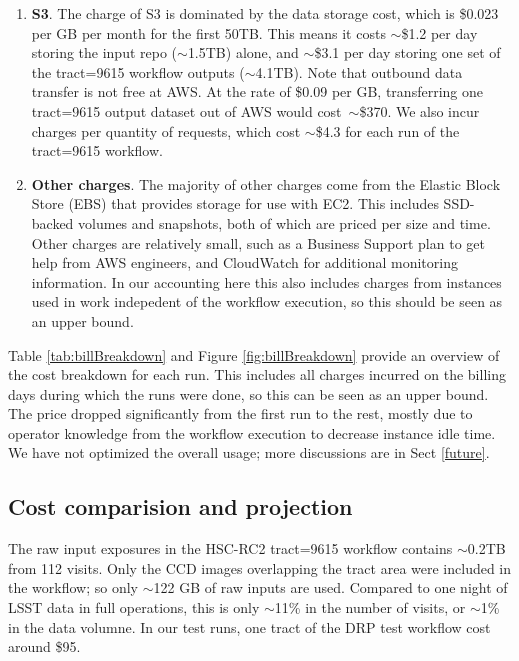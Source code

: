 \begin{enumerate}
\item \textbf{S3}.
The charge of S3 is dominated by the data storage cost, which is \$0.023 per GB per month for the first 50TB.
This means it costs $\sim$\$1.2 per day storing the input repo ($\sim$1.5TB) alone, and $\sim$\$3.1 per day storing one set of the tract=9615 workflow outputs ($\sim$4.1TB).
Note that outbound data transfer is not free at AWS.
At the rate of \$0.09 per GB, transferring one tract=9615 output dataset out of AWS would cost~$\sim$\$370.
We also incur charges per quantity of requests, which cost $\sim$\$4.3 for each run of the tract=9615 workflow.

\item \textbf{Other charges}.
The majority of other charges come from the Elastic Block Store (EBS) that provides storage for use with EC2.
This includes SSD-backed volumes and snapshots, both of which are priced per size and time.
Other charges are relatively small, such as a Business Support plan to get help from AWS engineers, and CloudWatch for additional monitoring information.
In our accounting here this also includes charges from instances used in work indepedent of the workflow execution, so this should be seen as an upper bound.

\end{enumerate}

Table \ref{tab:billBreakdown} and Figure \ref{fig:billBreakdown} provide an overview of the cost breakdown for each run.
This includes all charges incurred on the billing days during which the runs were done, so this can be seen as an upper bound.
The price dropped significantly from the first run to the rest, mostly due to operator knowledge from the workflow execution to decrease instance idle time.
We have not optimized the overall usage; more discussions are in Sect \ref{future}.



\subsection{Cost comparision and projection}

The raw input exposures in the HSC-RC2 tract=9615 workflow contains $\sim$0.2TB from 112 visits.
Only the CCD images overlapping the tract area were included in the workflow; so only $\sim$122 GB of raw inputs are used.
Compared to one night of LSST data in full operations, this is only $\sim$11\% in the number of visits, or $\sim$1\% in the data volumne.
In our test runs, one tract of the DRP test workflow cost around \$95.

